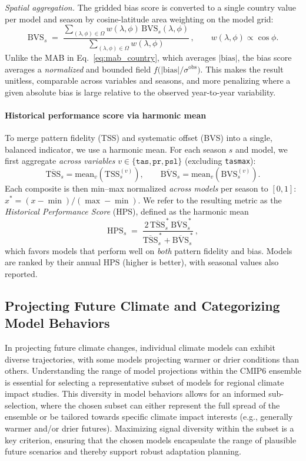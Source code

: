 \documentclass[pdflatex,sn-chicago]{sn-jnl}%
\theoremstyle{thmstyleone}%
\theoremstyle{thmstyletwo}%
\theoremstyle{thmstylethree}%
\begin{document}
\medskip
\noindent\textit{Spatial aggregation.} The gridded bias score is converted to a single country value per model and season by cosine-latitude area weighting on the model grid:
\[
\text{BVS}_s
\;=\;
\frac{\displaystyle \sum_{(\lambda,\phi)\in\Omega} w(\lambda,\phi)\,
\text{BVS}_s(\lambda,\phi)}
{\displaystyle \sum_{(\lambda,\phi)\in\Omega} w(\lambda,\phi)} \,,
\qquad w(\lambda,\phi)\propto \cos\phi.
\]
Unlike the MAB in Eq.~\eqref{eq:mab_country}, which averages \(|\text{bias}|\), the bias score averages a \emph{normalized} and bounded field \(f\!\big(|\text{bias}|/\sigma^{\text{obs}}\big)\). This makes the result unitless, comparable across variables and seasons, and more penalizing where a given absolute bias is large relative to the observed year-to-year variability.

\paragraph{\textbf{Historical performance score via harmonic mean}}\label{methods-hps}
To merge pattern fidelity (TSS) and systematic offset (BVS) into a single, balanced indicator, we use a harmonic mean. For each season \(s\) and model, we first aggregate \emph{across variables} \(v\in\{\texttt{tas},\texttt{pr},\texttt{psl}\}\) (excluding \texttt{tasmax}):
\[
\overline{\mathrm{TSS}}_{s}=\mathrm{mean}_{v}\!\left(\mathrm{TSS}_{s}^{(v)}\right), 
\qquad
\overline{\text{BVS}}_{s}=\mathrm{mean}_{v}\!\left(\text{BVS}_{s}^{(v)}\right).
\]
Each composite is then min--max normalized \emph{across models} per season to \([0,1]\): \(x^{\ast}=(x-\min)/(\max-\min)\). We refer to the resulting metric as the \emph{Historical Performance Score} (HPS), defined as the harmonic mean
\[
\mathrm{HPS}_{s}
\;=\;
\frac{2\,\overline{\mathrm{TSS}}_{s}^{\,\ast}\,\overline{\text{BVS}}_{s}^{\,\ast}}
{\overline{\mathrm{TSS}}_{s}^{\,\ast}+\overline{\text{BVS}}_{s}^{\,\ast}} \, ,
\]
which favors models that perform well on \emph{both} pattern fidelity and bias. Models are ranked by their annual \(\mathrm{HPS}\) (higher is better), with seasonal values also reported.


\subsection{Projecting Future Climate and Categorizing Model Behaviors}
In projecting future climate changes, individual climate models can exhibit diverse trajectories, with some models projecting warmer or drier conditions than others. Understanding the range of model projections within the CMIP6 ensemble is essential for selecting a representative subset of models for regional climate impact studies. This diversity in model behaviors allows for an informed sub-selection, where the chosen subset can either represent the full spread of the ensemble or be tailored towards specific climate impact interests (e.g., generally warmer and/or drier futures). Maximizing signal diversity within the subset is a key criterion, ensuring that the chosen models encapsulate the range of plausible future scenarios and thereby support robust adaptation planning.
\end{document}
